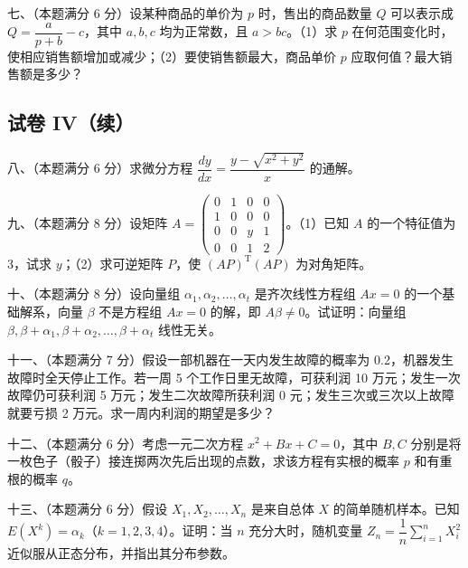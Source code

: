 \documentclass[UTF8,12pt]{ctexart}
\begin{document}
七、（本题满分 6 分）设某种商品的单价为 \(\displaystyle p\) 时，售出的商品数量 \(\displaystyle Q\) 可以表示成 \(\displaystyle Q=\dfrac{\displaystyle a}{\displaystyle p+b}-c\)，其中 \(\displaystyle a,\allowbreak b,\allowbreak c\) 均为正常数，且 \(\displaystyle a>bc\)。（1）求 \(\displaystyle p\) 在何范围变化时，使相应销售额增加或减少；（2）要使销售额最大，商品单价 \(\displaystyle p\) 应取何值？最大销售额是多少？


\subsection*{试卷 IV（续）}

八、（本题满分 6 分）求微分方程 \(\displaystyle \dfrac{\displaystyle dy}{\displaystyle dx}=\dfrac{\displaystyle y-\sqrt{x^2+y^2}}{\displaystyle x}\) 的通解。


九、（本题满分 8 分）设矩阵 \(\displaystyle A=\begin{pmatrix}0&1&0&0\\1&0&0&0\\0&0&y&1\\0&0&1&2\end{pmatrix}\)。（1）已知 \(\displaystyle A\) 的一个特征值为 3，试求 \(\displaystyle y\)；（2）求可逆矩阵 \(\displaystyle P\)，使 \(\displaystyle (AP)^{\mathrm T}(AP)\) 为对角矩阵。


十、（本题满分 8 分）设向量组 \(\displaystyle \alpha_1,\allowbreak \alpha_2,\allowbreak \ldots,\allowbreak \alpha_t\) 是齐次线性方程组 \(\displaystyle Ax=0\) 的一个基础解系，向量 \(\displaystyle \beta\) 不是方程组 \(\displaystyle Ax=0\) 的解，即 \(\displaystyle A\beta\ne0\)。试证明：向量组 \(\displaystyle \beta,\allowbreak \beta+\alpha_1,\allowbreak \beta+\alpha_2,\allowbreak \ldots,\allowbreak \beta+\alpha_t\) 线性无关。


十一、（本题满分 7 分）假设一部机器在一天内发生故障的概率为 0.2，机器发生故障时全天停止工作。若一周 5 个工作日里无故障，可获利润 10 万元；发生一次故障仍可获利润 5 万元；发生二次故障所获利润 0 元；发生三次或三次以上故障就要亏损 2 万元。求一周内利润的期望是多少？


十二、（本题满分 6 分）考虑一元二次方程 \(\displaystyle x^2+Bx+C=0\)，其中 \(\displaystyle B,\allowbreak C\) 分别是将一枚色子（骰子）接连掷两次先后出现的点数，求该方程有实根的概率 \(\displaystyle p\) 和有重根的概率 \(\displaystyle q\)。


十三、（本题满分 6 分）假设 \(\displaystyle X_1,\allowbreak X_2,\allowbreak \ldots,\allowbreak X_n\) 是来自总体 \(\displaystyle X\) 的简单随机样本。已知 \(\displaystyle E(X^k)=\alpha_k\)（\(\displaystyle k=1,\allowbreak 2,\allowbreak 3,\allowbreak 4\)）。证明：当 \(\displaystyle n\) 充分大时，随机变量 \(\displaystyle Z_n=\dfrac{\displaystyle 1}{\displaystyle n}\displaystyle \sum_{i=1}^nX_i^2\) 近似服从正态分布，并指出其分布参数。
\end{document}
